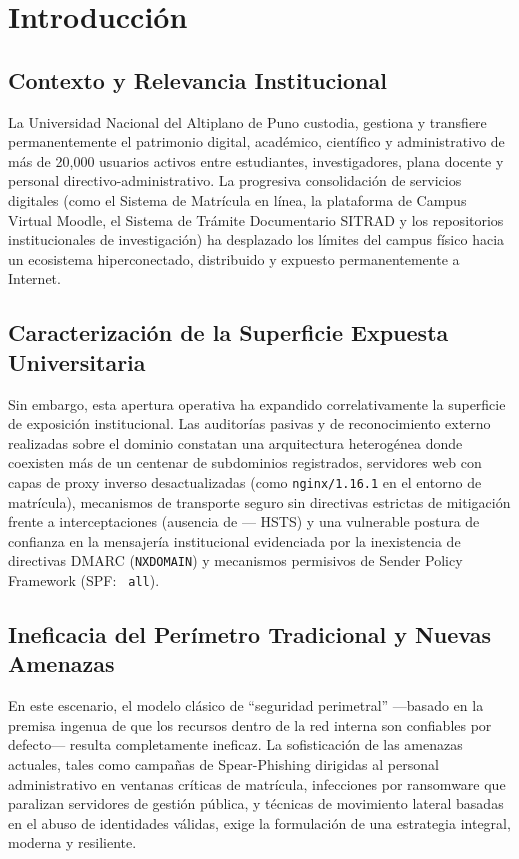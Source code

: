 \chapter{Introducción}
\label{ch:introduccion}

\section{Contexto y Relevancia Institucional}

La Universidad Nacional del Altiplano de Puno custodia, gestiona y transfiere permanentemente el patrimonio digital, académico, científico y administrativo de más de 20,000 usuarios activos entre estudiantes, investigadores, plana docente y personal directivo-administrativo. La progresiva consolidación de servicios digitales (como el Sistema de Matrícula en línea, la plataforma de Campus Virtual Moodle, el Sistema de Trámite Documentario SITRAD y los repositorios institucionales de investigación) ha desplazado los límites del campus físico hacia un ecosistema hiperconectado, distribuido y expuesto permanentemente a Internet.

\section{Caracterización de la Superficie Expuesta Universitaria}

Sin embargo, esta apertura operativa ha expandido correlativamente la superficie de exposición institucional. Las auditorías pasivas y de reconocimiento externo realizadas sobre el dominio  constatan una arquitectura heterogénea donde coexisten más de un centenar de subdominios registrados, servidores web con capas de proxy inverso desactualizadas (como \texttt{nginx/1.16.1} en el entorno de matrícula), mecanismos de transporte seguro sin directivas estrictas de mitigación frente a interceptaciones (ausencia de  --- HSTS) y una vulnerable postura de confianza en la mensajería institucional evidenciada por la inexistencia de directivas DMARC (\texttt{NXDOMAIN}) y mecanismos permisivos de Sender Policy Framework (SPF: \texttt{\string~all}).

\section{Ineficacia del Perímetro Tradicional y Nuevas Amenazas}

En este escenario, el modelo clásico de ``seguridad perimetral'' ---basado en la premisa ingenua de que los recursos dentro de la red interna son confiables por defecto--- resulta completamente ineficaz. La sofisticación de las amenazas actuales, tales como campañas de Spear-Phishing dirigidas al personal administrativo en ventanas críticas de matrícula, infecciones por ransomware que paralizan servidores de gestión pública, y técnicas de movimiento lateral basadas en el abuso de identidades válidas, exige la formulación de una estrategia integral, moderna y resiliente.

